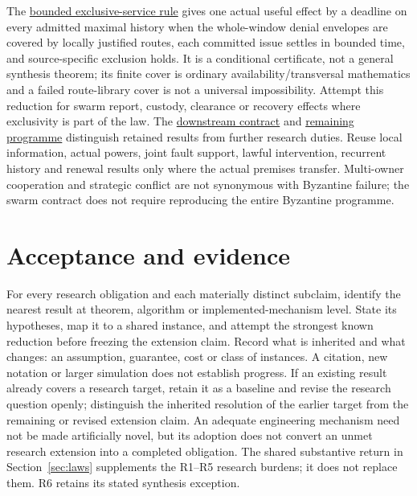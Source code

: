 \documentclass[11pt]{article}
\newcommand{\repo}[2]{\href{https://github.com/eternal-november/eos-research-programmes/blob/4359a8a1484498b9c46d8e58a0112448a1fba06b/projects/#1}{#2}}
\begin{document}
The \repo{byzantine-control/exclusive-service/RULE.md}{bounded exclusive-service rule} gives one actual useful effect by a deadline on every admitted maximal history when the whole-window denial envelopes are covered by locally justified routes, each committed issue settles in bounded time, and source-specific exclusion holds. It is a conditional certificate, not a general synthesis theorem; its finite cover is ordinary availability/transversal mathematics and a failed route-library cover is not a universal impossibility. Attempt this reduction for swarm report, custody, clearance or recovery effects where exclusivity is part of the law. The \repo{byzantine-control/DOWNSTREAM-CONTRACT.md}{downstream contract} and \repo{byzantine-control/REMAINING-PROGRAM.md}{remaining programme} distinguish retained results from further research duties. Reuse local information, actual powers, joint fault support, lawful intervention, recurrent history and renewal results only where the actual premises transfer. Multi-owner cooperation and strategic conflict are not synonymous with Byzantine failure; the swarm contract does not require reproducing the entire Byzantine programme.

\section{Acceptance and evidence}\label{sec:acceptance}
For every research obligation and each materially distinct subclaim, identify the nearest result at theorem, algorithm or implemented-mechanism level. State its hypotheses, map it to a shared instance, and attempt the strongest known reduction before freezing the extension claim. Record what is inherited and what changes: an assumption, guarantee, cost or class of instances. A citation, new notation or larger simulation does not establish progress. If an existing result already covers a research target, retain it as a baseline and revise the research question openly; distinguish the inherited resolution of the earlier target from the remaining or revised extension claim. An adequate engineering mechanism need not be made artificially novel, but its adoption does not convert an unmet research extension into a completed obligation. The shared substantive return in Section~\ref{sec:laws} supplements the R1--R5 research burdens; it does not replace them. R6 retains its stated synthesis exception.
\end{document}
